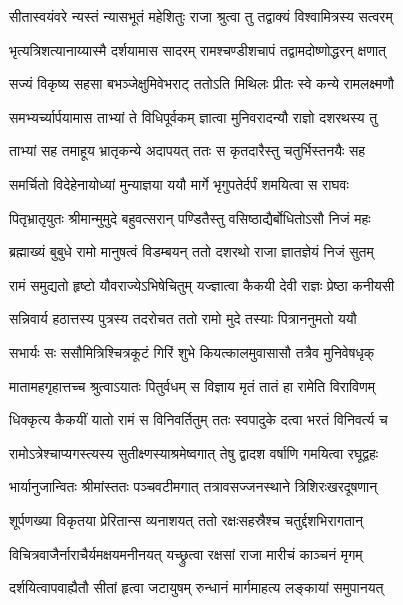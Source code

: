\twolineshloka
{सीतास्वयंवरे न्यस्तं न्यासभूतं महेशितुः}
{राजा श्रुत्वा तु तद्वाक्यं विश्वामित्रस्य सत्वरम्}%

\twolineshloka
{भृत्यत्रिशत्यानाय्यास्मै दर्शयामास सादरम्}
{रामश्चण्डीशचापं तद्वामदोष्णोद्धरन् क्षणात्}%

\twolineshloka
{सज्यं विकृष्य सहसा बभञ्जेक्षुमिवेभराट्}
{ततोऽति मिथिलः प्रीतः स्वे कन्ये रामलक्ष्मणौ}%

\twolineshloka
{समभ्यर्च्यार्पयामास ताभ्यां ते विधिपूर्वकम्}
{ज्ञात्वा मुनिवरादन्यौ राज्ञो दशरथस्य तु}%

\twolineshloka
{ताभ्यां सह तमाहूय भ्रातृकन्ये अदापयत्}
{ततः स कृतदारैस्तु चतुर्भिस्तनयैः सह}%

\twolineshloka
{समर्चितो विदेहेनायोध्यां मुन्याज्ञया ययौ}
{मार्गे भृगुपतेर्दर्पं शमयित्वा स राघवः}%

\twolineshloka
{पितृभ्रातृयुतः श्रीमान्मुमुदे बहुवत्सरान्}
{पण्डितैस्तु वसिष्ठाद्यैर्बोधितोऽसौ निजं महः}%

\twolineshloka
{ब्रह्माख्यं बुबुधे रामो मानुषत्वं विडम्बयन्}
{ततो दशरथो राजा ज्ञातज्ञेयं निजं सुतम्}%

\twolineshloka
{रामं समुद्यतो हृष्टो यौवराज्येऽभिषेचितुम्}
{यज्ज्ञात्वा कैकयी देवी राज्ञः प्रेष्ठा कनीयसी}%

\twolineshloka
{सन्निवार्य हठात्तस्य पुत्रस्य तदरोचत}
{ततो रामो मुदे तस्याः पित्राननुमतो ययौ}%

\twolineshloka
{सभार्यः सः ससौमित्रिश्चित्रकूटं गिरिं शुभे}
{कियत्कालमुवासासौ तत्रैव मुनिवेषधृक्}%

\twolineshloka
{मातामहगृहात्तच्च श्रुत्वाऽयातः पितुर्वधम्}
{स विज्ञाय मृतं तातं हा रामेति विराविणम्}%

\twolineshloka
{धिक्कृत्य कैकयीं यातो रामं स विनिवर्तितुम्}
{ततः स्वपादुके दत्वा भरतं विनिवर्त्य च}%

\twolineshloka
{रामोऽत्रेश्चाप्यगस्त्यस्य सुतीक्ष्णस्याश्रमेष्वगात्}
{तेषु द्वादश वर्षाणि गमयित्वा रघूद्वहः}%

\twolineshloka
{भार्यानुजान्वितः श्रीमांस्ततः पञ्चवटीमगात्}
{तत्रावसज्जनस्थाने त्रिशिरःखरदूषणान्}%

\twolineshloka
{शूर्पणख्या विकृतया प्रेरितान्स व्यनाशयत्}
{ततो रक्षःसहस्रैश्च चतुर्द्दशभिरागतान्}%

\twolineshloka
{विचित्रवाजैर्नाराचैर्यमक्षयमनीनयत्}
{यच्छ्रुत्वा रक्षसां राजा मारीचं काञ्चनं मृगम्}%

\twolineshloka
{दर्शयित्वापवाह्यैतौ सीतां हृत्वा जटायुषम्}
{रुन्धानं मार्गमाहत्य लङ्कायां समुपानयत्}%

